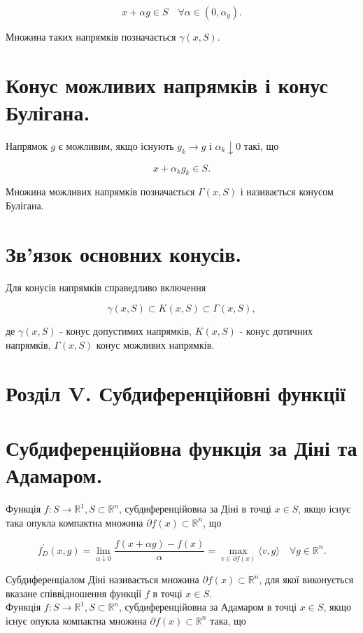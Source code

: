 \documentclass[10pt]{article}
\begin{document}
$$
x+\alpha g \in S \quad \forall \alpha \in\left(0, \alpha_{g}\right) .
$$

Множина таких напрямків позначається $\gamma(x, S)$.

\section*{Конус можливих напрямків і конус Булігана.}
Напрямок $g$ є можливим, якщо існують $g_{k} \rightarrow g$ і $\alpha_{k} \downarrow 0$ такі, що

$$
x+\alpha_{k} g_{k} \in S .
$$

Множина можливих напрямків позначається $\Gamma(x, S)$ і називається конусом Булігана.

\section*{Зв'язок основних конусів.}
Для конусів напрямків справедливо включення

$$
\gamma(x, S) \subset K(x, S) \subset \Gamma(x, S),
$$

де $\gamma(x, S)$ - конус допустимих напрямків, $K(x, S)$ - конус дотичних напрямків, $\Gamma(x, S)$ конус можливих напрямків.

\section*{Розділ V. Субдиференційовні функції}
\section*{Субдиференційовна функція за Діні та Адамаром.}
Функція $f: S \rightarrow \mathbb{R}^{1}, S \subset \mathbb{R}^{n}$, субдиференційовна за Діні в точці $x \in S$, якщо існує така опукла компактна множина $\partial f(x) \subset \mathbb{R}^{n}$, що

$$
f_{D}^{\prime}(x, g)=\lim _{\alpha \downarrow 0} \frac{f(x+\alpha g)-f(x)}{\alpha}=\max _{v \in \partial f(x)}\langle v, g\rangle \quad \forall g \in \mathbb{R}^{n} .
$$

Субдиференціалом Діні називається множина $\partial f(x) \subset \mathbb{R}^{n}$, для якої виконується вказане співвідношення функції $f$ в точці $x \in S$.\\
Функція $f: S \rightarrow \mathbb{R}^{1}, S \subset \mathbb{R}^{n}$, субдиференційовна за Адамаром в точці $x \in S$, якщо існує опукла компактна множина $\partial f(x) \subset \mathbb{R}^{n}$ така, що
\end{document}
